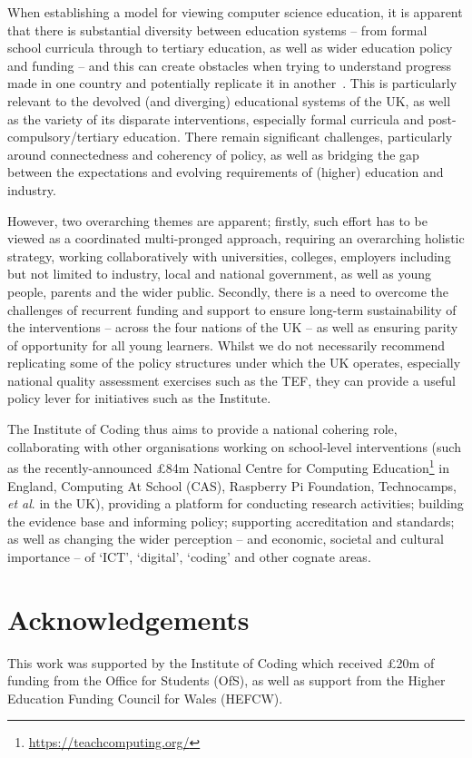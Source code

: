 \documentclass[sigconf,anonymous]{acmart}
\begin{document}
When establishing a model for viewing computer science education, it
is apparent that there is substantial diversity between education
systems -- from formal school curricula through to tertiary education,
as well as wider education policy and funding -- and this can create
obstacles when trying to understand progress made in one country and
potentially replicate it in another~\cite{hubwieser:2013}. This is
particularly relevant to the devolved (and diverging) educational
systems of the UK, as well as the variety of its disparate
interventions, especially formal curricula and
post-compulsory/tertiary education.  There remain significant
challenges, particularly around connectedness and coherency of policy,
as well as bridging the gap between the expectations and evolving
requirements of (higher) education and industry.

However, two overarching themes are apparent; firstly, such effort has
to be viewed as a coordinated multi-pronged approach, requiring an
overarching holistic strategy, working collaboratively with
universities, colleges, employers including but not limited to
industry, local and national government, as well as young people,
parents and the wider public. Secondly, there is a need to overcome
the challenges of recurrent funding and support to ensure long-term
sustainability of the interventions -- across the four nations of the
UK -- as well as ensuring parity of opportunity for all young
learners. Whilst we do not necessarily recommend replicating some of
the policy structures under which the UK operates, especially national
quality assessment exercises such as the TEF, they can provide a
useful policy lever for initiatives such as the Institute.

The Institute of Coding thus aims to provide a national cohering role,
collaborating with other organisations working on school-level
interventions (such as the recently-announced \pounds84m National
Centre for Computing
Education\footnote{\url{https://teachcomputing.org/}} in England,
Computing At School (CAS), Raspberry Pi Foundation, Technocamps, {\it
et al\/}. in the UK), providing a platform for conducting research
activities; building the evidence base and informing policy;
supporting accreditation and standards; as well as changing the wider
perception -- and economic, societal and cultural importance -- of
`ICT', `digital', `coding' and other cognate areas.

\section*{Acknowledgements}

This work was supported by the Institute of Coding which received
\pounds20m of funding from the Office for Students (OfS), as well as
support from the Higher Education Funding Council for Wales (HEFCW).
\ifanon
\fi


 
\end{document}
